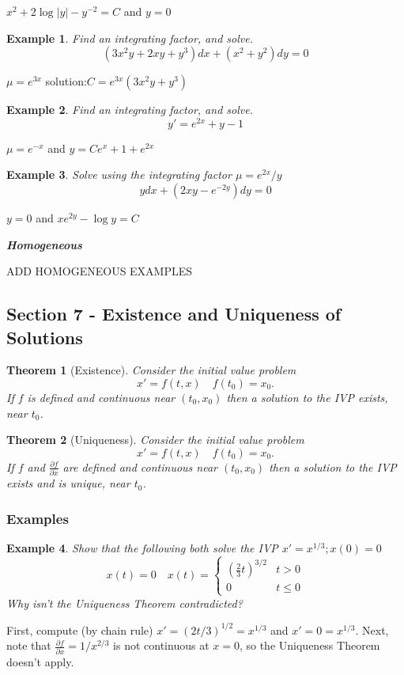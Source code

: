\documentclass[14pt]{article}
\newtheorem{ex}{Example}
\newtheorem{thm}{Theorem}
\newcommand{\type}[1]{\begin{center} \emph{\textbf{#1}} \end{center}}
\newcommand{\exs}{\subsubsection*{Examples}}
\begin{document}
$x^2 + 2 \log |y | - y^{-2} = C $ and $y = 0$

\begin{ex}Find an integrating factor, and solve.
\[(3x^2 y + 2 x y + y^3)dx + (x^2 + y^2) dy =0\]
\end{ex}

$\mu = e^{3x}$ solution:$C=e^{3x}(3x^2 y + y^3)$


\begin{ex}Find an integrating factor, and solve.
\[y' = e^{2x} +y -1\]
\end{ex}

$\mu = e^{-x} $ and $y = C e^x + 1 + e ^{2x}$

\begin{ex}Solve using the integrating factor $\mu = e^{2x} / y$
\[y dx + (2 x y - e^{-2y}) dy = 0\]
\end{ex}

$y=0$ and $x e^{2 y} - \log y = C$

\type{Homogeneous}
ADD HOMOGENEOUS EXAMPLES

\subsection{Section 7 - Existence and Uniqueness of Solutions}
\begin{thm}[Existence]Consider the initial value problem
\[x' = f(t,x) \quad f(t_0) = x_0.\] 
If $f$ is defined and continuous near $(t_0, x_0)$ then a solution to the IVP exists, near $t_0$.
\end{thm}


\begin{thm}[Uniqueness]Consider the initial value problem
\[x' = f(t,x) \quad f(t_0) = x_0.\] 
If $f$ and $\frac{\partial f}{\partial x}$ are  defined and continuous near $(t_0, x_0)$ then a solution to the IVP exists and is unique, near $t_0$.
\end{thm}

\exs


\begin{ex}Show that the following both solve the IVP $x' = x^{1/3}; x(0) = 0$ 
\[x(t) = 0 \quad x(t) = 
\begin{cases}
(\frac{2}{3} t) ^{3/2} & t > 0 \\
0 & t \leq 0
\end{cases}\]
Why isn't the Uniqueness Theorem contradicted?
\end{ex}

First, compute (by chain rule) $x' = (2t/3)^{1/2} = x^{1/3}$ and $x' = 0 = x^{1/3}$. Next, note that $\frac{\partial f }{ \partial x} = 1 / x^{2/3}$ is not continuous at $x =0$, so the Uniqueness Theorem doesn't apply.
\end{document}
